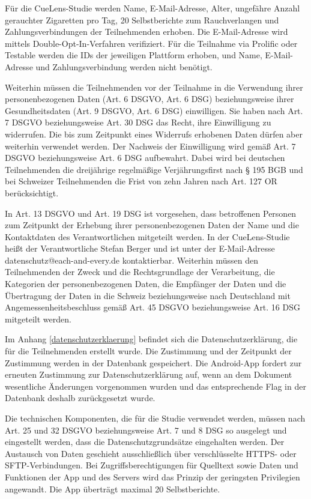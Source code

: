 Für die CueLens-Studie werden Name, E-Mail-Adresse, Alter, ungefähre Anzahl gerauchter Zigaretten pro Tag, 20 Selbstberichte zum Rauchverlangen und Zahlungsverbindungen der Teilnehmenden erhoben. Die E-Mail-Adresse wird mittels Double-Opt-In-Verfahren verifiziert. Für die Teilnahme via Prolific oder Testable werden die IDs der jeweiligen Plattform erhoben, und Name, E-Mail-Adresse und Zahlungsverbindung werden nicht benötigt.

Weiterhin müssen die Teilnehmenden vor der Teilnahme in die Verwendung ihrer personenbezogenen Daten (Art. 6 DSGVO, Art. 6 DSG) beziehungsweise ihrer Gesundheitsdaten (Art. 9 DSGVO, Art. 6 DSG) einwilligen. Sie haben nach Art. 7 DSGVO beziehungsweise Art. 30 DSG das Recht, ihre Einwilligung zu widerrufen. Die bis zum Zeitpunkt eines Widerrufs erhobenen Daten dürfen aber weiterhin verwendet werden. Der Nachweis der Einwilligung wird gemäß Art. 7 DSGVO beziehungsweise Art. 6 DSG aufbewahrt. Dabei wird bei deutschen Teilnehmenden die dreijährige regelmäßige Verjährungsfirst nach § 195 BGB und bei Schweizer Teilnehmenden die Frist von zehn Jahren nach Art. 127 OR berücksichtigt.

In Art. 13 DSGVO und Art. 19 DSG ist vorgesehen, dass betroffenen Personen zum Zeitpunkt der Erhebung ihrer personenbezogenen Daten der Name und die Kontaktdaten des Verantwortlichen mitgeteilt werden. In der CueLens-Studie heißt der Verantwortliche Stefan Berger und ist unter der E-Mail-Adresse datenschutz@each-and-every.de kontaktierbar. Weiterhin müssen den Teilnehmenden der Zweck und die Rechtsgrundlage der Verarbeitung, die Kategorien der personenbezogenen Daten, die Empfänger der Daten und die Übertragung der Daten in die Schweiz beziehungsweise nach Deutschland mit Angemessenheitsbeschluss gemäß Art. 45 DSGVO beziehungsweise Art. 16 DSG mitgeteilt werden. 

Im Anhang \ref{datenschutzerklaerung} befindet sich die Datenschutzerklärung, die für die Teilnehmenden erstellt wurde. Die Zustimmung und der Zeitpunkt der Zustimmung werden in der Datenbank gespeichert. Die Android-App fordert zur erneuten Zustimmung zur Datenschutzerklärung auf, wenn an dem Dokument wesentliche Änderungen vorgenommen wurden und das entsprechende Flag in der Datenbank deshalb zurückgesetzt wurde. 

Die technischen Komponenten, die für die Studie verwendet werden, müssen nach Art. 25 und 32 DSGVO beziehungsweise Art. 7 und 8 DSG so ausgelegt und eingestellt werden, dass die Datenschutzgrundsätze eingehalten werden. Der Austausch von Daten geschieht ausschließlich über verschlüsselte HTTPS- oder SFTP-Verbindungen. Bei Zugriffsberechtigungen für Quelltext sowie Daten und Funktionen der App und des Servers wird das Prinzip der geringsten Privilegien angewandt. Die App überträgt maximal 20 Selbstberichte.

